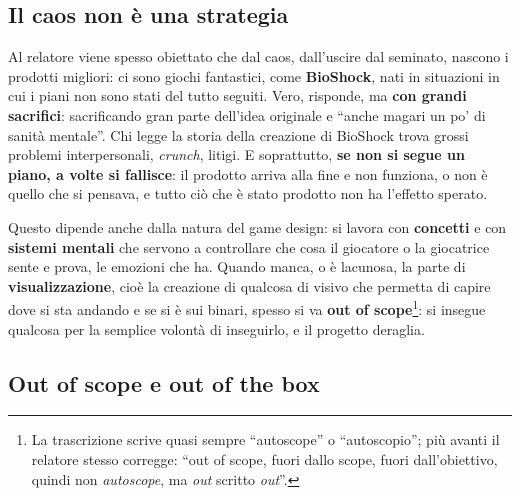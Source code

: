 \subsection{Il caos non è una strategia}

Al relatore viene spesso obiettato che dal caos, dall'uscire dal seminato,
nascono i prodotti migliori: ci sono giochi fantastici, come
\textbf{BioShock}, nati in situazioni in cui i piani non sono stati del tutto
seguiti. Vero, risponde, ma \textbf{con grandi sacrifici}: sacrificando gran
parte dell'idea originale e ``anche magari un po' di sanità mentale''. Chi
legge la storia della creazione di BioShock trova grossi problemi
interpersonali, \emph{crunch}, litigi. E soprattutto, \textbf{se non si segue
un piano, a volte si fallisce}: il prodotto arriva alla fine e non funziona, o
non è quello che si pensava, e tutto ciò che è stato prodotto non ha l'effetto
sperato.

Questo dipende anche dalla natura del game design: si lavora con
\textbf{concetti} e con \textbf{sistemi mentali} che servono a controllare che
cosa il giocatore o la giocatrice sente e prova, le emozioni che ha. Quando
manca, o è lacunosa, la parte di \textbf{visualizzazione}, cioè la creazione di
qualcosa di visivo che permetta di capire dove si sta andando e se si è sui
binari, spesso si va \textbf{out of scope}\footnote{La trascrizione scrive
quasi sempre ``autoscope'' o ``autoscopio''; più avanti il relatore stesso
corregge: ``out of scope, fuori dallo scope, fuori dall'obiettivo, quindi non
\emph{autoscope}, ma \emph{out} scritto \emph{out}''.}: si insegue qualcosa per
la semplice volontà di inseguirlo, e il progetto deraglia.

\subsection{Out of scope e out of the box}
\label{subsec:z6-out-of-scope}

